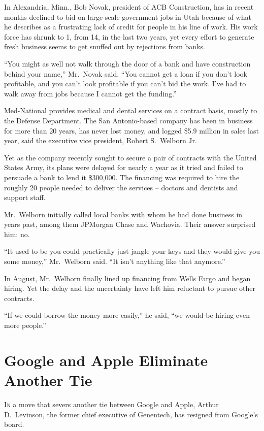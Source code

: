 ﻿\documentclass[12pt]{article}
\begin{document}
In Alexandria, Minn., Bob Novak, president of ACB Construction, has in recent months declined to bid
on large-scale government jobs in Utah because of what he describes as a frustrating lack of credit
for people in his line of work. His work force has shrunk to 1, from 14, in the last two years, yet
every effort to generate fresh business seems to get snuffed out by rejections from banks.

``You might as well not walk through the door of a bank and have construction behind your name,''
Mr.~Novak said. ``You cannot get a loan if you don't look profitable, and you can't look profitable
if you can't bid the work. I've had to walk away from jobs because I cannot get the funding.''

Med-National provides medical and dental services on a contract basis, mostly to the Defense
Department. The San Antonio-based company has been in business for more than 20 years, has never
lost money, and logged \$5.9 million in sales last year, said the executive vice president, Robert
S.~Welborn Jr.

Yet as the company recently sought to secure a pair of contracts with the United States Army, its
plans were delayed for nearly a year as it tried and failed to persuade a bank to lend it \$300,000.
The financing was required to hire the roughly 20 people needed to deliver the services -- doctors
and dentists and support staff.

Mr.~Welborn initially called local banks with whom he had done business in years past, among them
JPMorgan Chase and Wachovia. Their answer surprised him: no.

``It used to be you could practically just jangle your keys and they would give you some money,''
Mr.~Welborn said. ``It isn't anything like that anymore.''

In August, Mr.~Welborn finally lined up financing from Wells Fargo and began hiring. Yet the delay
and the uncertainty have left him reluctant to pursue other contracts.

``If we could borrow the money more easily,'' he said, ``we would be hiring even more people.''

\section{Google and Apple Eliminate Another Tie}

\lettrine{I}{n} a move that severs another tie between Google and Apple,
Arthur D.~Levinson, the former chief executive of Genentech, has resigned from Google's board.
\end{document}
